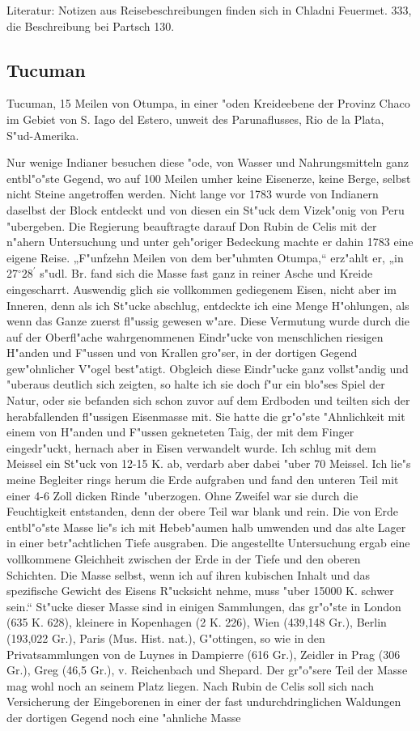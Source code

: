 \documentclass[a4paper, 11pt, oneside]{article}
\begin{document}
\footnotesize
Literatur: Notizen aus Reisebeschreibungen finden sich in Chladni Feuermet. 333, die Beschreibung bei Partsch 130.

\normalsize
\subsection{Tucuman}

Tucuman, 15 Meilen von Otumpa, in einer "oden Kreideebene
der Provinz Chaco im Gebiet von S. Iago del Estero, unweit des Parunaflusses, Rio de la Plata, S"ud-Amerika.

Nur wenige Indianer besuchen diese "ode, von Wasser und Nahrungsmitteln ganz entbl"o"ste Gegend, wo auf 100 Meilen umher keine Eisenerze, keine Berge, selbst nicht Steine angetroffen werden. Nicht lange vor 1783 wurde von Indianern daselbst der Block entdeckt und von diesen ein St"uck dem Vizek"onig von Peru "ubergeben. Die Regierung beauftragte darauf Don Rubin de Celis mit der n"ahern Untersuchung und unter geh"origer Bedeckung machte er dahin 1783 eine eigene Reise. „F"unfzehn Meilen von dem ber"uhmten Otumpa,“ erz"ahlt er, „in 27$^\circ28^\prime$ s"udl. Br. fand sich die Masse fast ganz in reiner Asche und Kreide eingescharrt. Auswendig glich sie vollkommen gediegenem Eisen, nicht aber im Inneren, denn als ich St"ucke abschlug, entdeckte ich eine Menge H"ohlungen, als wenn das Ganze zuerst fl"ussig gewesen w"are. Diese Vermutung wurde durch die auf der Oberfl"ache wahrgenommenen Eindr"ucke von menschlichen riesigen H"anden und F"ussen und von Krallen gro"ser, in der dortigen Gegend gew"ohnlicher V"ogel best"atigt. Obgleich diese Eindr"ucke ganz vollst"andig und "uberaus deutlich sich zeigten, so halte ich sie doch f"ur ein blo"ses Spiel der Natur, oder sie befanden sich schon zuvor auf dem Erdboden und teilten sich der herabfallenden fl"ussigen Eisenmasse mit. Sie hatte die gr"o"ste "Ahnlichkeit mit einem von H"anden und F"ussen gekneteten Taig, der mit dem Finger eingedr"uckt, hernach aber in Eisen verwandelt wurde. Ich schlug mit dem Meissel ein St"uck von 12-15 K. ab, verdarb aber dabei "uber 70 Meissel. Ich lie"s meine Begleiter rings herum die Erde aufgraben und fand den unteren Teil mit einer 4-6 Zoll dicken Rinde "uberzogen. Ohne Zweifel war sie durch die Feuchtigkeit entstanden, denn der obere Teil war blank und rein. Die von Erde entbl"o"ste Masse lie"s ich mit Hebeb"aumen halb umwenden und das alte Lager in einer betr"achtlichen Tiefe ausgraben. Die angestellte Untersuchung ergab eine vollkommene Gleichheit zwischen der Erde in der Tiefe und den oberen Schichten. Die Masse selbst, wenn ich auf ihren kubischen Inhalt und das spezifische Gewicht des Eisens R"ucksicht nehme, muss "uber 15000 K. schwer sein.“ St"ucke dieser Masse sind in einigen Sammlungen, das gr"o"ste in London (635 K. 628), kleinere in Kopenhagen (2 K. 226), Wien (439,148 Gr.), Berlin (193,022 Gr.), Paris (Mus. Hist. nat.), G"ottingen, so wie in den Privatsammlungen von de Luynes in Dampierre (616 Gr.), Zeidler in Prag (306 Gr.), Greg (46,5 Gr.), v. Reichenbach und Shepard. Der gr"o"sere Teil der Masse mag wohl noch an seinem Platz liegen. Nach Rubin de Celis soll sich nach Versicherung der Eingeborenen in einer der fast undurchdringlichen Waldungen der dortigen Gegend noch eine "ahnliche Masse 
\end{document}
